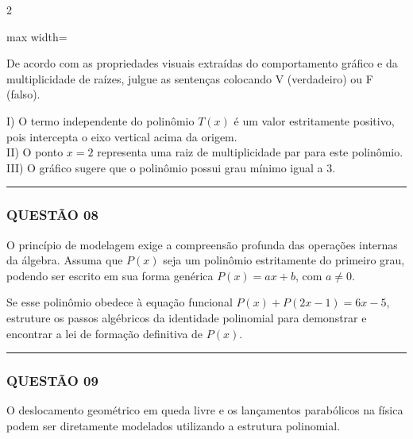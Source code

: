 \documentclass[11pt, a4paper]{article}
\begin{document}
\begin{multicols*}{2}
\begin{center}
\begin{adjustbox}{max width=\linewidth}
\end{adjustbox}
\end{center}

De acordo com as propriedades visuais extraídas do comportamento gráfico e da multiplicidade de raízes, julgue as sentenças colocando V (verdadeiro) ou F (falso).

I) O termo independente do polinômio $ T(x) $ é um valor estritamente positivo, pois intercepta o eixo vertical acima da origem.\\[0.3cm]
II) O ponto $ x = 2 $ representa uma raiz de multiplicidade par para este polinômio.\\[0.3cm]
III) O gráfico sugere que o polinômio possui grau mínimo igual a 3.

\vspace{0cm} \noindent\textcolor{CorLinha}{\rule{\linewidth}{0.5pt}} \vspace{-0.2cm}
\subsubsection*{QUESTÃO 08}

O princípio de modelagem exige a compreensão profunda das operações internas da álgebra. Assuma que $ P(x) $ seja um polinômio estritamente do primeiro grau, podendo ser escrito em sua forma genérica $ P(x) = ax + b $, com $ a \neq 0 $.

Se esse polinômio obedece à equação funcional $ P(x) + P(2x - 1) = 6x - 5 $, estruture os passos algébricos da identidade polinomial para demonstrar e encontrar a lei de formação definitiva de $ P(x) $.

\vspace{0cm} \noindent\textcolor{CorLinha}{\rule{\linewidth}{0.5pt}} \vspace{-0.2cm}
\subsubsection*{QUESTÃO 09}

O deslocamento geométrico em queda livre e os lançamentos parabólicos na física podem ser diretamente modelados utilizando a estrutura polinomial. 


\end{multicols*}
\end{document}
